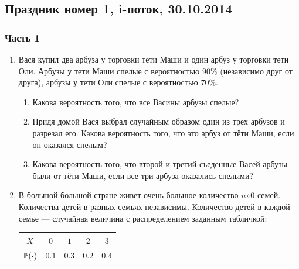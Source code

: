 \documentclass[12pt, a4paper]{article}\usepackage[]{graphicx}\usepackage[]{color}
\begin{document}
\subsection{Праздник номер 1, i-поток, 30.10.2014}

\subsubsection*{ Часть 1}

\begin{enumerate}


\item Вася купил два арбуза у торговки тети Маши и один арбуз у торговки тети Оли. Арбузы у тети Маши спелые с вероятностью 90\% (независимо друг от друга), арбузы у тети Оли спелые с вероятностью 70\%.

\begin{enumerate}
\item Какова вероятность того, что все Васины арбузы спелые?
\item Придя домой Вася выбрал случайным образом один из трех арбузов и разрезал его. Какова вероятность того, что это арбуз от тёти Маши, если он оказался спелым?
\item Какова вероятность того, что второй и третий съеденные Васей арбузы были от тёти Маши, если все три арбуза оказались спелыми?
\end{enumerate}


\item В большой большой стране живет очень большое количество $n»0$ семей. Количества детей в разных семьях независимы. Количество детей в каждой семье — случайная величина с распределением заданным табличкой:

\begin{tabular}{ccccc}
\toprule
$X$ & $0$ & $1$ & $2$ & $3$ \\ \midrule
$\P(\cdot)$ & $0.1$ & $0.3$ & $0.2$ & $0.4$ \\ \bottomrule
\end{tabular}


\end{enumerate}
\end{document}
